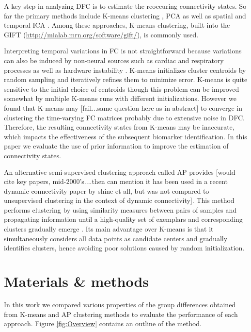 \documentclass{article}
\begin{document}
A key step in analyzing \ac{DFC} is to estimate the reoccuring connectivity states. So far the primary methods include K-means clustering \cite{allen_tracking_2014}, \ac{PCA} \cite{leonardi_disentangling_2014} as well as spatial and temporal \ac{ICA} \cite{du_group_2015} \cite{miller_higher_2016}. Among these approaches, K-means clustering, built into the \ac{GIFT} (\href{http://mialab.mrn.org/software/gift/}{http://mialab.mrn.org/software/gift/}), is commonly used.

Interpreting temporal variations in \ac{FC} is not straightforward because variations can also be induced by non-neural sources such as cardiac and respiratory processes as well as hardware instability \cite{hutchison_dynamic_2013}. K-means initializes cluster centroids by random sampling and iteratively refines them to minimize error. K-means is quite sensitive to the initial choice of centroids though this problem can be improved somewhat by multiple K-means runs with different initializations. However we found that K-means may [fail...same question here as in abstract] to converge in clustering the time-varying \ac{FC} matrices probably due to extensive noise in \ac{DFC}. Therefore, the resulting connectivity states from K-means may be inaccurate, which impacts the effectiveness of the subsequent biomarker identification. In this paper we evaluate the use of prior information to improve the estimation of connectivity states.

An alternative semi-supervised clustering approach called \acl{AP}  provides [would cite key papers, mid-2000's....then can mention it has been used in a recent dynamic connectivity paper by shine et all, but was not compared to unsupervised clustering in the context of dynamic connectivity]. This method performs clustering by using similarity measures between pairs of samples and propagating information until a high-quality set of exemplars and corresponding clusters gradually emerge \cite{frey_clustering_2007}. Its main advantage over K-means is that it simultaneously considers all data points as candidate centers and gradually identifies clusters, hence avoiding poor solutions caused by random initialization.

\section{Materials \& methods}
\label{sec:MaterialsM}

In this work we compared various properties of the group differences obtained from K-means and \ac{AP} clustering methods to evaluate the performance of each approach. Figure \ref{fig:Overview} contains an outline of the method.
\end{document}
